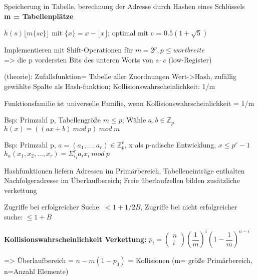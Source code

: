 Speicherung in Tabelle, berechnung der Adresse durch Hashen eines Schlüssels \\
\textbf{m = Tabellenplätze}


$h(s) \lfloor m \lbrace sc \rbrace \rfloor$ mit $ \lbrace x \rbrace  = x - \lfloor x \rfloor$;
optimal mit c = $0.5(1+\sqrt{5})$ 

Implementieren mit Shift-Operationen für $m = 2^p, p\leq wortbreite$\\
=> die p vordersten Bits des unteren Worts von $s\cdot c$ (low-Register)


(theorie): Zufallsfunktion= Tabelle aller Zuordnungen Wert->Hash, zufällig gewählte Spalte als Hash-funktion;
Kollisionswahrscheinlichkeit: 1/m

Funktionsfamilie ist universelle Familie, wenn Kollisionswahrscheinlichkeit = 1/m

Bsp: Primzahl p, Tabellengröße $m \leq p$; Wähle $a,b \in \mathbb{Z}_p$\\
$h(x) = ((ax+b)~mod~ p )~ mod~ m$

Bsp: Primzahl p, $a=(a_1,\dots,a_r) \in \mathbb{Z}_p^r$, x als p-adische Entwicklung, $x \leq p^r-1$\\
$h_a( x_1, x_2, \dots ,x_r ) = \Sigma_{i_1}^r a_i x_i ~mod ~p$

Hashfunktionen liefern Adressen im Primärbereich, Tabelleneinträge enthalten Nachfolgeradresse im Überlaufbereich; Freie überlaufzellen bilden zusätzliche verkettung


Zugriffe bei erfolgreicher Suche: $<1+1/2B$, Zugriffe bei nicht erfolgreicher suche: $\leq 1+ B$

\textbf{Kollisionswahrscheinlichkeit Verkettung:} $p_i = \left( \begin{array}{c}n \\ i\end{array} \right) \left( \dfrac{1}{m} \right)^i \left( 1- \dfrac{1}{m} \right)^{n-i} $

=> Überlaufbereich = $n-m(1-p_0)$  =  Kollisionen (m= größe Primärbereich, n=Anzahl Elemente) 

